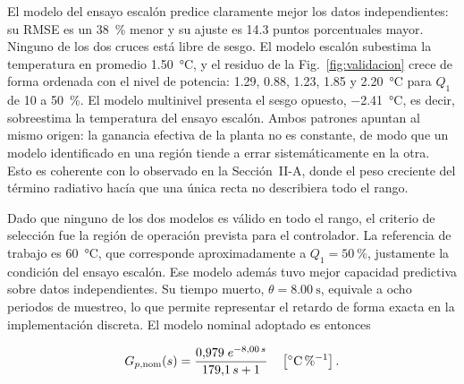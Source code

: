 El modelo del ensayo escalón predice claramente mejor los datos independientes: su RMSE es un
\SI{38}{\percent} menor y su ajuste es \num{14.3} puntos porcentuales mayor. Ninguno de los dos
cruces está libre de sesgo. El modelo escalón subestima la temperatura en promedio
\SI{1.50}{\celsius}, y el residuo de la Fig.~\ref{fig:validacion} crece de forma ordenada con el
nivel de potencia: \num{+1.29}, \num{+0.88}, \num{+1.23}, \num{+1.85} y \SI{+2.20}{\celsius} para
$Q_1$ de \num{10} a \SI{50}{\percent}. El modelo multinivel presenta el sesgo opuesto,
\SI{-2.41}{\celsius}, es decir, sobreestima la temperatura del ensayo escalón. Ambos patrones
apuntan al mismo origen: la ganancia efectiva de la planta no es constante, de modo que un modelo
identificado en una región tiende a errar sistemáticamente en la otra. Esto es coherente con lo
observado en la Sección~II-A, donde el peso creciente del término radiativo hacía que una única
recta no describiera todo el rango.

Dado que ninguno de los dos modelos es válido en todo el rango, el criterio de selección fue la
región de operación prevista para el controlador. La referencia de trabajo es \SI{60}{\celsius},
que corresponde aproximadamente a $Q_1 = \SI{50}{\percent}$, justamente la condición del ensayo
escalón. Ese modelo además tuvo mejor capacidad predictiva sobre datos independientes. Su tiempo
muerto, $\theta = \SI{8.00}{\second}$, equivale a ocho periodos de muestreo, lo que permite
representar el retardo de forma exacta en la implementación discreta. El modelo nominal adoptado es
entonces

\begin{equation}
G_{p,\mathrm{nom}}(s) = \frac{0{,}979\;e^{-8{,}00\,s}}{179{,}1\,s + 1}
\quad \left[\si{\celsius\per\percent}\right].
\label{eq:gpnom}
\end{equation}
